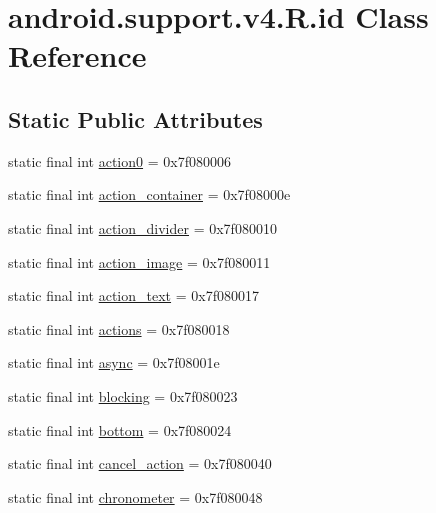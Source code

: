 \hypertarget{classandroid_1_1support_1_1v4_1_1_r_1_1id}{}\section{android.\+support.\+v4.\+R.\+id Class Reference}
\label{classandroid_1_1support_1_1v4_1_1_r_1_1id}
\subsection*{Static Public Attributes}
\begin{DoxyCompactItemize}
\item 
static final int \mbox{\hyperlink{classandroid_1_1support_1_1v4_1_1_r_1_1id_ad7592f41400f9252a235131ada4828fb}{action0}} = 0x7f080006
\item 
static final int \mbox{\hyperlink{classandroid_1_1support_1_1v4_1_1_r_1_1id_a1617e4a9372cb50c61bb626f78a0a55d}{action\+\_\+container}} = 0x7f08000e
\item 
static final int \mbox{\hyperlink{classandroid_1_1support_1_1v4_1_1_r_1_1id_a4041bc4105d0b0cf5cc0f800ccb65ab3}{action\+\_\+divider}} = 0x7f080010
\item 
static final int \mbox{\hyperlink{classandroid_1_1support_1_1v4_1_1_r_1_1id_a6b9142767e8558d1af9795db9ffd33c1}{action\+\_\+image}} = 0x7f080011
\item 
static final int \mbox{\hyperlink{classandroid_1_1support_1_1v4_1_1_r_1_1id_ab16eb01fb830a44ed3fa8f597f28b41b}{action\+\_\+text}} = 0x7f080017
\item 
static final int \mbox{\hyperlink{classandroid_1_1support_1_1v4_1_1_r_1_1id_ab48152021fc3f70bd7f40d59bd201328}{actions}} = 0x7f080018
\item 
static final int \mbox{\hyperlink{classandroid_1_1support_1_1v4_1_1_r_1_1id_affba5f51dd3beb3137a18fe8b868f042}{async}} = 0x7f08001e
\item 
static final int \mbox{\hyperlink{classandroid_1_1support_1_1v4_1_1_r_1_1id_ae7200c743d91bf8b61111e5ea58e4476}{blocking}} = 0x7f080023
\item 
static final int \mbox{\hyperlink{classandroid_1_1support_1_1v4_1_1_r_1_1id_aab918f3816949f77099f7717b436aae1}{bottom}} = 0x7f080024
\item 
static final int \mbox{\hyperlink{classandroid_1_1support_1_1v4_1_1_r_1_1id_a1791e09cc075d5474cf241c9df1a6ffd}{cancel\+\_\+action}} = 0x7f080040
\item 
static final int \mbox{\hyperlink{classandroid_1_1support_1_1v4_1_1_r_1_1id_a9ba1c8e430ff76f2ee59bfccd415c103}{chronometer}} = 0x7f080048

\end{DoxyCompactItemize}
